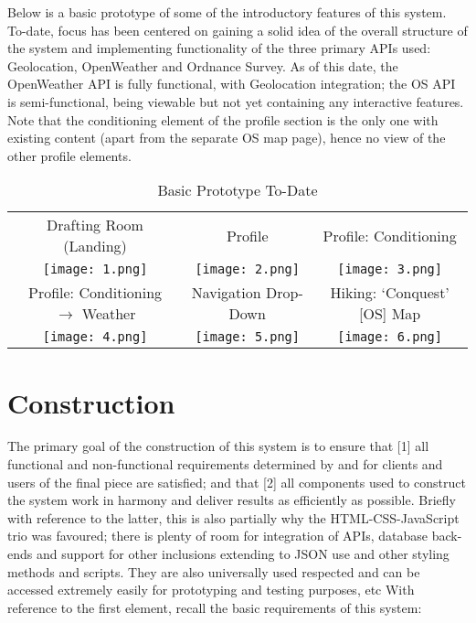\documentclass[11pt, english]{article}
\begin{document}
	Below is a basic prototype of some of the introductory features of this system. To-date, focus has been centered on gaining a solid idea of the overall structure of the system and implementing functionality of the three primary APIs used: Geolocation, OpenWeather and Ordnance Survey. As of this date, the OpenWeather API is fully functional, with Geolocation integration; the OS API is semi-functional, being viewable but not yet containing any interactive features. Note that the conditioning element of the profile section is the only one with existing content (apart from the separate OS map page), hence no view of the other profile elements.

	\begin{table}[h]
		\scriptsize
		\renewcommand{\arraystretch}{1.25}
	\begin{center}
	\begin{tabular}{ccc}
		Drafting Room (Landing) & Profile & Profile: Conditioning\\
		\texttt{[image: 1.png]} & \texttt{[image: 2.png]} & \texttt{[image: 3.png]}\\
		Profile: Conditioning $\rightarrow$ Weather & Navigation Drop-Down & Hiking: `Conquest' [OS] Map\\
		\texttt{[image: 4.png]} & \texttt{[image: 5.png]} & \texttt{[image: 6.png]}\\
	\end{tabular}
		\caption{Basic Prototype To-Date}
	\end{center}
	\end{table}

\newpage

\section{Construction}
	
	The primary goal of the construction of this system is to ensure that [1] all functional and non-functional requirements determined by and for clients and users of the final piece are satisfied; and that [2] all components used to construct the system work in harmony and deliver results as efficiently as possible. Briefly with reference to the latter, this is also partially why the HTML-CSS-JavaScript trio was favoured; there is plenty of room for integration of APIs, database back-ends and support for other inclusions extending to JSON use and other styling methods and scripts. They are also universally used respected and can be accessed extremely easily for prototyping and testing purposes, etc With reference to the first element, recall the basic requirements of this system:
\end{document}
